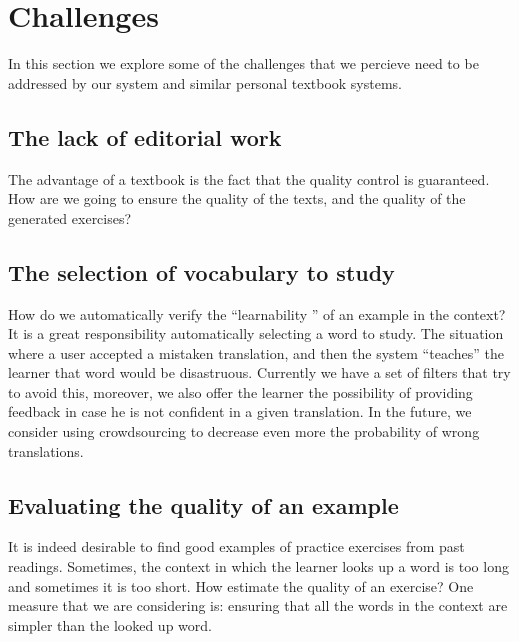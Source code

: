 

\newpage
\section{Challenges}

In this section we explore some of the challenges that we percieve need to be addressed by our system and similar personal textbook systems.

\subsection{The lack of editorial work}
The advantage of a textbook is the fact that the quality control is guaranteed. How are we going to ensure the quality of the texts, and the quality of the generated exercises? 

\subsection{The selection of vocabulary to study}

How do we automatically verify the ``learnability '' of an example in the context? It is a great responsibility automatically selecting a word to study. The situation where a user accepted a mistaken translation, and then the system ``teaches'' the learner that word would be disastruous. Currently we have a set of filters that try to avoid this, moreover, we also offer the learner the possibility of providing feedback in case he is not confident in a given translation. In the future, we consider using crowdsourcing to decrease even more the probability of wrong translations.


\subsection{Evaluating the quality of an example}

It is indeed desirable to find good examples of practice exercises from past readings. Sometimes, the context in which the learner looks up a word is too long and sometimes it is too short. How estimate the quality of an exercise? One measure that we are considering is: ensuring that all the words in the context are simpler than the looked up word. 


